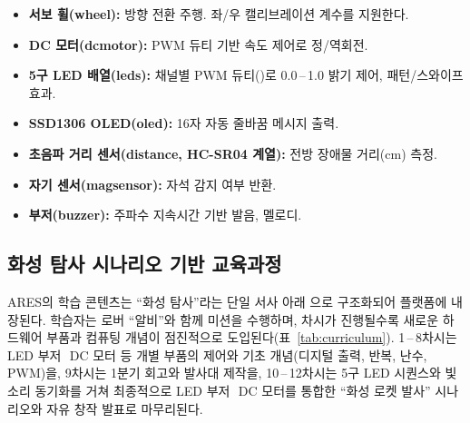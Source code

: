 \documentclass[10pt]{article}
\begin{document}
\begin{itemize}
  \item \textbf{서보 휠(wheel):} 방향 전환 주행. 좌/우 캘리브레이션 계수를 지원한다.
  \item \textbf{DC 모터(dcmotor):} PWM 듀티 기반 속도 제어로 정/역회전.
  \item \textbf{5구 LED 배열(leds):} 채널별 PWM 듀티()로 0.0\,--\,1.0
        밝기 제어, 패턴/스와이프 효과.
  \item \textbf{SSD1306 OLED(oled):} 16자 자동 줄바꿈 메시지 출력.
  \item \textbf{초음파 거리 센서(distance, HC-SR04 계열):} 전방 장애물 거리(cm) 측정.
  \item \textbf{자기 센서(magsensor):} 자석 감지 여부 반환.
  \item \textbf{부저(buzzer):} 주파수\,\textperiodcentered\,지속시간 기반 발음, 멜로디.
\end{itemize}

\subsection{화성 탐사 시나리오 기반 교육과정}
\label{sec:curriculum}

ARES의 학습 콘텐츠는 ``화성 탐사''라는 단일 서사 아래 으로 구조화되어 플랫폼에 내장된다. 학습자는 로버 ``알비''와 함께 미션을
수행하며, 차시가 진행될수록 새로운 하드웨어 부품과 컴퓨팅 개념이 점진적으로
도입된다(표~\ref{tab:curriculum}). 1\,--\,8차시는 LED\,\textperiodcentered\,부저
\,\textperiodcentered\,DC 모터 등 개별 부품의 제어와 기초 개념(디지털 출력, 반복,
난수, PWM)을, 9차시는 1분기 회고와 발사대 제작을, 10\,--\,12차시는 5구 LED 시퀀스와
빛\,\textperiodcentered\,소리 동기화를 거쳐 최종적으로 LED\,\textperiodcentered\,부저
\,\textperiodcentered\,DC 모터를 통합한 ``화성 로켓 발사'' 시나리오와 자유 창작
발표로 마무리된다.
\end{document}
